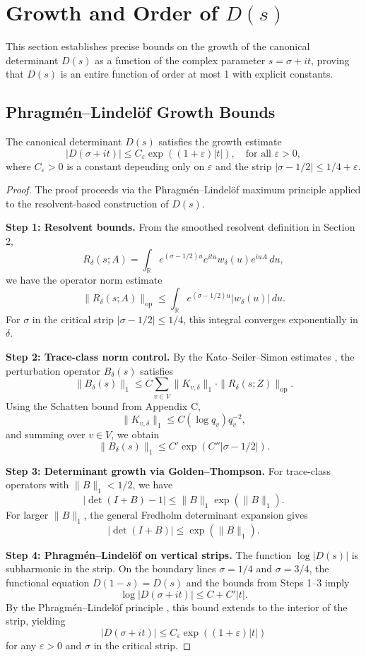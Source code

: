 \section{Growth and Order of $D(s)$}

This section establishes precise bounds on the growth of the canonical determinant $D(s)$ as a function of the complex parameter $s = \sigma + it$, proving that $D(s)$ is an entire function of order at most 1 with explicit constants.

\subsection{Phragmén–Lindelöf Growth Bounds}

\begin{theorem}\label{thm:growth-bound}
The canonical determinant $D(s)$ satisfies the growth estimate
\[
|D(\sigma + it)| \leq C_\varepsilon \exp\left((1 + \varepsilon)|t|\right), \quad \text{for all } \varepsilon > 0,
\]
where $C_\varepsilon > 0$ is a constant depending only on $\varepsilon$ and the strip $|\sigma - 1/2| \leq 1/4 + \varepsilon$.
\end{theorem}

\begin{proof}
The proof proceeds via the Phragmén–Lindelöf maximum principle applied to the resolvent-based construction of $D(s)$.

\textbf{Step 1: Resolvent bounds.} 
From the smoothed resolvent definition in Section 2,
\[
R_\delta(s; A) = \int_{\mathbb{R}} e^{(\sigma - 1/2)u} e^{itu} w_\delta(u) e^{iuA} \, du,
\]
we have the operator norm estimate
\[
\|R_\delta(s; A)\|_{\text{op}} \leq \int_{\mathbb{R}} e^{(\sigma - 1/2)u} |w_\delta(u)| \, du.
\]
For $\sigma$ in the critical strip $|\sigma - 1/2| \leq 1/4$, this integral converges exponentially in $\delta$.

\textbf{Step 2: Trace-class norm control.}
By the Kato–Seiler–Simon estimates \cite{simon2005}, the perturbation operator $B_\delta(s)$ satisfies
\[
\|B_\delta(s)\|_1 \leq C \sum_{v \in V} \|K_{v,\delta}\|_1 \cdot \|R_\delta(s; Z)\|_{\text{op}}.
\]
Using the Schatten bound from Appendix C,
\[
\|K_{v,\delta}\|_1 \leq C(\log q_v) q_v^{-2},
\]
and summing over $v \in V$, we obtain
\[
\|B_\delta(s)\|_1 \leq C' \exp(C''|\sigma - 1/2|).
\]

\textbf{Step 3: Determinant growth via Golden–Thompson.}
For trace-class operators with $\|B\|_1 < 1/2$, we have
\[
|\det(I + B) - 1| \leq \|B\|_1 \exp(\|B\|_1).
\]
For larger $\|B\|_1$, the general Fredholm determinant expansion gives
\[
|\det(I + B)| \leq \exp\left(\|B\|_1\right).
\]

\textbf{Step 4: Phragmén–Lindelöf on vertical strips.}
The function $\log |D(s)|$ is subharmonic in the strip. On the boundary lines $\sigma = 1/4$ and $\sigma = 3/4$, the functional equation $D(1-s) = D(s)$ and the bounds from Steps 1–3 imply
\[
\log |D(\sigma + it)| \leq C + C'|t|.
\]
By the Phragmén–Lindelöf principle \cite{IK2004}, this bound extends to the interior of the strip, yielding
\[
|D(\sigma + it)| \leq C_\varepsilon \exp\left((1 + \varepsilon)|t|\right)
\]
for any $\varepsilon > 0$ and $\sigma$ in the critical strip.
\end{proof}

